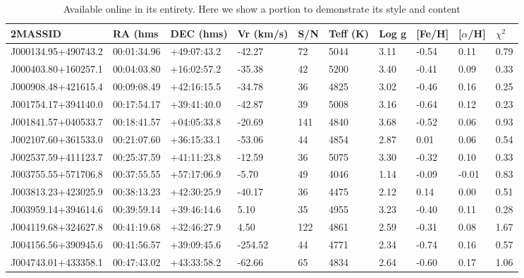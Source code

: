 \documentclass[a4paper,fleqn,usenatbib]{mnras}
\begin{document}
\begin{table}[]
\centering
\caption{Available online in its entirety. Here we show a portion to demonstrate its style and content}
\label{table:table1}
\begin{tabular}{@{}|l|l|l|l|l|l|l|l|l|l|@{}}
\toprule
2MASSID             & RA (hms         & DEC (hms)        & Vr (km/s) & S/N & Teff (K) & Log g & {[}Fe/H{]} & {[}$\alpha$/H{]} & $\chi^2$  \\ \midrule
J000134.95+490743.2 & 00:01:34.96 & +49:07:43.2 & -42.27    & 72  & 5044 & 3.11  & -0.54      & 0.11      & 0.79 \\ \midrule
J000403.80+160257.1 & 00:04:03.80 & +16:02:57.2 & -35.38    & 42  & 5200 & 3.40  & -0.41      & 0.09      & 0.33 \\ \midrule
J000908.48+421615.4 & 00:09:08.49 & +42:16:15.5 & -34.78    & 36  & 4825 & 3.02  & -0.46      & 0.16      & 0.25 \\ \midrule
J001754.17+394140.0 & 00:17:54.17 & +39:41:40.0 & -42.87    & 39  & 5008 & 3.16  & -0.64      & 0.12      & 0.23 \\ \midrule
J001841.57+040533.7 & 00:18:41.57 & +04:05:33.8 & -20.69    & 141 & 4840 & 3.68  & -0.52      & 0.06      & 0.93 \\ \midrule
J002107.60+361533.0 & 00:21:07.60 & +36:15:33.1 & -53.06    & 44  & 4854 & 2.87  & 0.01       & 0.06      & 0.54 \\ \midrule
J002537.59+411123.7 & 00:25:37.59 & +41:11:23.8 & -12.59    & 36  & 5075 & 3.30  & -0.32      & 0.10      & 0.33 \\ \midrule
J003755.55+571706.8 & 00:37:55.55 & +57:17:06.9 & -5.70     & 49  & 4046 & 1.14  & -0.09      & -0.01     & 0.83 \\ \midrule
J003813.23+423025.9 & 00:38:13.23 & +42:30:25.9 & -40.17    & 36  & 4475 & 2.12  & 0.14       & 0.00      & 0.51 \\ \midrule
J003959.14+394614.6 & 00:39:59.14 & +39:46:14.6 & 5.10      & 35  & 4955 & 3.23  & -0.40      & 0.11      & 0.28 \\ \midrule
J004119.68+324627.8 & 00:41:19.68 & +32:46:27.9 & 4.50      & 122 & 4861 & 2.59  & -0.31      & 0.08      & 1.67 \\ \midrule
J004156.56+390945.6 & 00:41:56.57 & +39:09:45.6 & -254.52   & 44  & 4771 & 2.34  & -0.74      & 0.16      & 0.57 \\ \midrule
J004743.01+433358.1 & 00:47:43.02 & +43:33:58.2 & -62.66    & 65  & 4834 & 2.64  & -0.60      & 0.17      & 1.06 \\ \midrule

\end{tabular}
\end{table}
\end{document}
